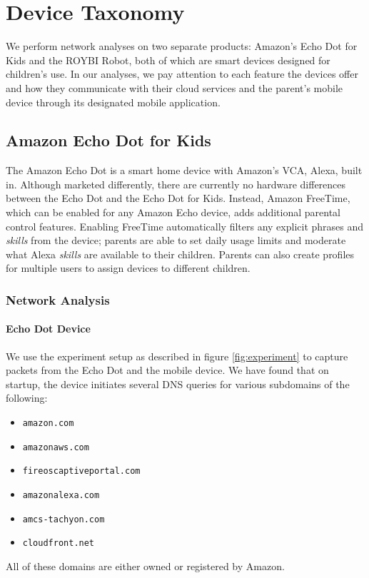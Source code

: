 \documentclass[12pt]{ucthesis}
\begin{document}
\chapter{Device Taxonomy}
\label{ch:taxonomy}
We perform network analyses on two separate products: Amazon's Echo Dot for Kids and the ROYBI Robot, both of which are smart devices designed for children's use. In our analyses, we pay attention to each feature the devices offer and how they communicate with their cloud services and the parent's mobile device through its designated mobile application.

\section{Amazon Echo Dot for Kids}
The Amazon Echo Dot is a smart home device with Amazon's VCA, Alexa, built in. Although marketed differently, there are currently no hardware differences between the Echo Dot and the Echo Dot for Kids. Instead, Amazon FreeTime, which can be enabled for any Amazon Echo device, adds additional parental control features. Enabling FreeTime automatically filters any explicit phrases and \textit{skills} from the device; parents are able to set daily usage limits and moderate what Alexa \textit{skills} are available to their children. Parents can also create profiles for multiple users to assign devices to different children.

\subsection{Network Analysis}
\subsubsection{Echo Dot Device}
We use the experiment setup as described in figure \ref{fig:experiment} to capture packets from the Echo Dot and the mobile device. We have found that on startup, the device initiates several DNS queries for various subdomains of the following:
\begin{itemize} 
    \item \texttt{amazon.com}
    \item \texttt{amazonaws.com}
    \item \texttt{fireoscaptiveportal.com}
    \item \texttt{amazonalexa.com}
    \item \texttt{amcs-tachyon.com}
    \item \texttt{cloudfront.net}
\end{itemize}
All of these domains are either owned or registered by Amazon. 
\end{document}
